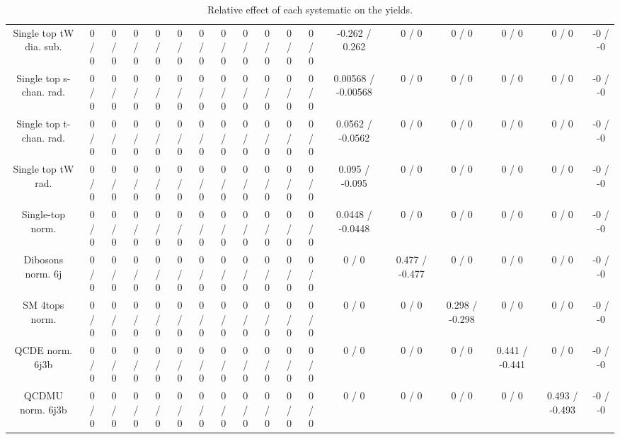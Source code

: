 \documentclass[10pt]{article}
\begin{document}
\begin{table}[htbp]
\begin{center}
\begin{tabular}{|c|c|c|c|c|c|c|c|c|c|c|c|c|c|c|c|c|c|}
  Single top tW dia. sub. & 0 / 0 & 0 / 0 & 0 / 0 & 0 / 0 & 0 / 0 & 0 / 0 & 0 / 0 & 0 / 0 & 0 / 0 & 0 / 0 & 0 / 0 & -0.262 / 0.262 & 0 / 0 & 0 / 0 & 0 / 0 & 0 / 0 & -0 / -0 \\ 
  Single top s-chan. rad. & 0 / 0 & 0 / 0 & 0 / 0 & 0 / 0 & 0 / 0 & 0 / 0 & 0 / 0 & 0 / 0 & 0 / 0 & 0 / 0 & 0 / 0 & 0.00568 / -0.00568 & 0 / 0 & 0 / 0 & 0 / 0 & 0 / 0 & -0 / -0 \\ 
  Single top t-chan. rad. & 0 / 0 & 0 / 0 & 0 / 0 & 0 / 0 & 0 / 0 & 0 / 0 & 0 / 0 & 0 / 0 & 0 / 0 & 0 / 0 & 0 / 0 & 0.0562 / -0.0562 & 0 / 0 & 0 / 0 & 0 / 0 & 0 / 0 & -0 / -0 \\ 
  Single top tW rad. & 0 / 0 & 0 / 0 & 0 / 0 & 0 / 0 & 0 / 0 & 0 / 0 & 0 / 0 & 0 / 0 & 0 / 0 & 0 / 0 & 0 / 0 & 0.095 / -0.095 & 0 / 0 & 0 / 0 & 0 / 0 & 0 / 0 & -0 / -0 \\ 
  Single-top norm. & 0 / 0 & 0 / 0 & 0 / 0 & 0 / 0 & 0 / 0 & 0 / 0 & 0 / 0 & 0 / 0 & 0 / 0 & 0 / 0 & 0 / 0 & 0.0448 / -0.0448 & 0 / 0 & 0 / 0 & 0 / 0 & 0 / 0 & -0 / -0 \\ 
  Dibosons norm. 6j & 0 / 0 & 0 / 0 & 0 / 0 & 0 / 0 & 0 / 0 & 0 / 0 & 0 / 0 & 0 / 0 & 0 / 0 & 0 / 0 & 0 / 0 & 0 / 0 & 0.477 / -0.477 & 0 / 0 & 0 / 0 & 0 / 0 & -0 / -0 \\ 
  SM 4tops norm. & 0 / 0 & 0 / 0 & 0 / 0 & 0 / 0 & 0 / 0 & 0 / 0 & 0 / 0 & 0 / 0 & 0 / 0 & 0 / 0 & 0 / 0 & 0 / 0 & 0 / 0 & 0.298 / -0.298 & 0 / 0 & 0 / 0 & -0 / -0 \\ 
  QCDE norm. 6j3b & 0 / 0 & 0 / 0 & 0 / 0 & 0 / 0 & 0 / 0 & 0 / 0 & 0 / 0 & 0 / 0 & 0 / 0 & 0 / 0 & 0 / 0 & 0 / 0 & 0 / 0 & 0 / 0 & 0.441 / -0.441 & 0 / 0 & -0 / -0 \\ 
  QCDMU norm. 6j3b & 0 / 0 & 0 / 0 & 0 / 0 & 0 / 0 & 0 / 0 & 0 / 0 & 0 / 0 & 0 / 0 & 0 / 0 & 0 / 0 & 0 / 0 & 0 / 0 & 0 / 0 & 0 / 0 & 0 / 0 & 0.493 / -0.493 & -0 / -0 \\ 
\hline 
\end{tabular} 
\caption{Relative effect of each systematic on the yields.} 
\end{center} 
\end{table} 
\end{document}
